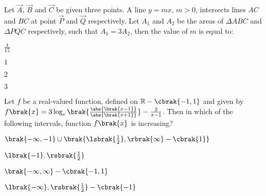 \item Let $\vec{A}$, $\vec{B}$ and $\vec{C}$ be given three points. A line $y = mx$, $m > 0$, intersects lines $AC$ and $BC$ at point $\vec{P}$ and $\vec{Q}$ respectively. Let $A_1$ and $A_2$ be the areas of $\Delta ABC$ and $\Delta PQC$ respectively, such that $A_1 = 3A_2$, then the value of $m$ is equal to:

\hfill{}
\begin{enumerate}
\begin{multicols}{4}
\item $\frac{4}{15}$
\item $1$
\item $2$
\item $3$
\end{multicols}
\end{enumerate}

\item Let $f$ be a real-valued function, defined on $\mathbb{R}-\cbrak{-1, 1}$ and given by $f\brak{x} = 3\log_e\brak{{\frac{\abs{\brak{x-1}}}{\abs{\brak{x+1}}}}}-\frac{2}{x-1}$. Then in which of the following intervals, function $f\brak{x}$ is increasing?

\hfill{}
\begin{enumerate}
\begin{multicols}{2}
\item $\brak{-\infty,-1}\cup\brak{\lsbrak{\frac{1}{2}},\rbrak{\infty}-\cbrak{1}}$
\item $\lbrak{-1},\rsbrak{\frac{1}{2}}$
\item $\brak{-\infty,\infty}-\cbrak{-1,1}$
\item $\lbrak{-\infty},\rsbrak{\frac{1}{2}}-\cbrak{-1}$
\end{multicols}
\end{enumerate}


